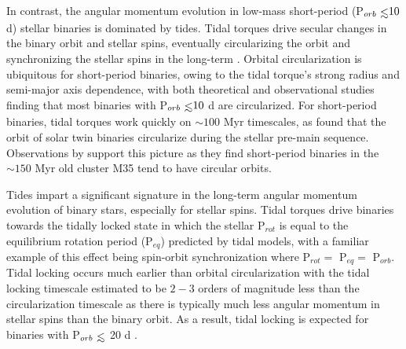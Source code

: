 In contrast, the angular momentum evolution in low-mass short-period (P$_{orb} \lsim 10$ d) stellar binaries is dominated by tides.  Tidal torques drive secular changes in the binary orbit and stellar spins, eventually circularizing the orbit and synchronizing the stellar spins in the long-term \citep{Counselman1973}. Orbital circularization is ubiquitous for short-period binaries, owing to the tidal torque's strong radius and semi-major axis dependence, with both theoretical \citep[e.g.][]{Zahn1989,Claret1995} and observational \citep[e.g.][]{Meibom2005,Mazeh2008,Lurie2017} studies finding that most binaries with P$_{orb} \lsim 10$ d are circularized. For short-period binaries, tidal torques work quickly on ${\sim}100$ Myr timescales, as \citet{Zahn1989} found that the orbit of solar twin binaries circularize during the stellar pre-main sequence.  Observations by \citet{Meibom2005} support this picture as they find short-period binaries in the ${\sim}150$ Myr old cluster M35 tend to have circular orbits.

Tides impart a significant signature in the long-term angular momentum evolution of binary stars, especially for stellar spins. Tidal torques drive binaries towards the tidally locked state in which the stellar P$_{rot}$ is equal to the equilibrium rotation period (P$_{eq}$) predicted by tidal models, with a familiar example of this effect being spin-orbit synchronization where P$_{rot} = $ P$_{eq} = $ P$_{orb}$.  Tidal locking occurs much earlier than orbital circularization with the tidal locking timescale estimated to be $2-3$ orders of magnitude less than the circularization timescale \citep{Zahn1989,Witte2002,Mazeh2008} as there is typically much less angular momentum in stellar spins than the binary orbit. As a result, tidal locking is expected for binaries with P$_{orb} \lsim$ 20 d \citep[e.g.][]{Levato1974,Meibom2006,Mazeh2008,Zahn2008,Meibom2015}.

